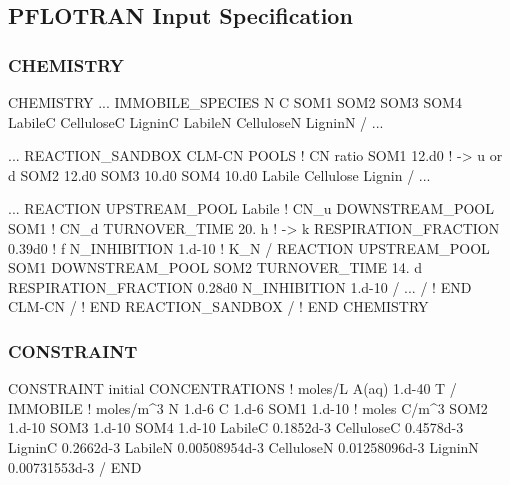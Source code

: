 \documentclass{beamer}
\newcommand\bluecomment[1]{{{\color{blue} #1}}}
\begin{document}
\subsection{PFLOTRAN Input Specification}

\begin{frame}\frametitle{CHEMISTRY}
\small
\begin{semiverbatim}
CHEMISTRY
  ...
  IMMOBILE_SPECIES
    N
    C
    SOM1
    SOM2
    SOM3
    SOM4
    LabileC
    CelluloseC
    LigninC
    LabileN
    CelluloseN
    LigninN
  /
  ...
\end{semiverbatim}
\newpage
\begin{semiverbatim}

  ...
  REACTION_SANDBOX
    CLM-CN
      POOLS   \bluecomment{! CN ratio}
        SOM1   12.d0   \bluecomment{! -> u or d}
        SOM2   12.d0
        SOM3   10.d0
        SOM4   10.d0
        Labile
        Cellulose
        Lignin
      /
      ...
\end{semiverbatim}
\newpage
\begin{semiverbatim}
      ...
      REACTION
        UPSTREAM_POOL Labile         \bluecomment{! CN_u}
        DOWNSTREAM_POOL SOM1         \bluecomment{! CN_d}
        TURNOVER_TIME 20. h          \bluecomment{! -> k}
        RESPIRATION_FRACTION 0.39d0  \bluecomment{! f}
        N_INHIBITION 1.d-10          \bluecomment{! K_N}
      /
      REACTION
        UPSTREAM_POOL SOM1
        DOWNSTREAM_POOL SOM2
        TURNOVER_TIME 14. d
        RESPIRATION_FRACTION 0.28d0
        N_INHIBITION 1.d-10
      /
      ...
    / \bluecomment{! END CLM-CN}
  / \bluecomment{! END REACTION_SANDBOX}
/ \bluecomment{! END CHEMISTRY}
\end{semiverbatim}
\end{frame}

\begin{frame}[fragile]\frametitle{CONSTRAINT}
\footnotesize
\begin{semiverbatim}
CONSTRAINT initial
  CONCENTRATIONS   \bluecomment{! moles/L}
    A(aq)  1.d-40  T
  /
  IMMOBILE       \bluecomment{! moles/m^3}
    N     1.d-6
    C     1.d-6
    SOM1  1.d-10 \bluecomment{! moles C/m^3}
    SOM2  1.d-10
    SOM3  1.d-10
    SOM4  1.d-10
    LabileC     0.1852d-3
    CelluloseC  0.4578d-3
    LigninC     0.2662d-3
    LabileN     0.00508954d-3
    CelluloseN  0.01258096d-3
    LigninN     0.00731553d-3
  /
END
\end{semiverbatim}
\end{frame}
\end{document}
